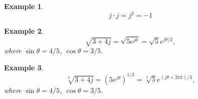 \documentclass[11pt]{article}
\newtheorem{example}{Example}
\begin{document}
\begin{example}
\begin{displaymath}
j\cdot j = j^2 = -1
\end{displaymath}
\end{example}

\begin{example}
\begin{displaymath}
\sqrt{3 + 4j} = \sqrt{5e^{j\theta}} = \sqrt{5}e^{j\theta/2},
\end{displaymath}
where $\sin{\theta} = 4 / 5$, $\cos{\theta} = 3 / 5$.
\end{example}

\begin{example}
\begin{displaymath}
\sqrt[3]{3 + 4j} = (5e^{j\theta})^{1/3} = \sqrt[3]{5}e^{(j\theta + 2\pi k)/3},
\end{displaymath}
where $\sin{\theta} = 4 / 5$, $\cos{\theta} = 3 / 5$.
\end{example}
\end{document}
